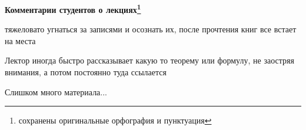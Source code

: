 		\textbf{Комментарии студентов о лекциях\protect\footnote{сохранены оригинальные орфография и пунктуация}}
            \begin{commentbox} 
                тяжеловато угнаться за записями и осознать их, после прочтения книг все встает на места 
            \end{commentbox} 
        
            \begin{commentbox} 
                Лектор иногда быстро рассказывает какую то теорему или формулу, не заостряя внимания, а потом постоянно туда ссылается 
            \end{commentbox} 
        
            \begin{commentbox} 
                Слишком много материала... 
            \end{commentbox} 
        
    
